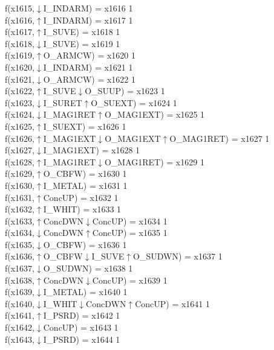 f(x1615,$\downarrow$I\_INDARM) = x1616 {1} \\
f(x1616,$\uparrow$I\_INDARM) = x1617 {1} \\
f(x1617,$\uparrow$I\_SUVE) = x1618 {1} \\
f(x1618,$\downarrow$I\_SUVE) = x1619 {1} \\
f(x1619,$\uparrow$O\_ARMCW) = x1620 {1} \\
f(x1620,$\downarrow$I\_INDARM) = x1621 {1} \\
f(x1621,$\downarrow$O\_ARMCW) = x1622 {1} \\
f(x1622,$\uparrow$I\_SUVE$\downarrow$O\_SUUP) = x1623 {1} \\
f(x1623,$\downarrow$I\_SURET$\uparrow$O\_SUEXT) = x1624 {1} \\
f(x1624,$\downarrow$I\_MAG1RET$\uparrow$O\_MAG1EXT) = x1625 {1} \\
f(x1625,$\uparrow$I\_SUEXT) = x1626 {1} \\
f(x1626,$\uparrow$I\_MAG1EXT$\downarrow$O\_MAG1EXT$\uparrow$O\_MAG1RET) = x1627 {1} \\
f(x1627,$\downarrow$I\_MAG1EXT) = x1628 {1} \\
f(x1628,$\uparrow$I\_MAG1RET$\downarrow$O\_MAG1RET) = x1629 {1} \\
f(x1629,$\uparrow$O\_CBFW) = x1630 {1} \\
f(x1630,$\uparrow$I\_METAL) = x1631 {1} \\
f(x1631,$\uparrow$ConcUP) = x1632 {1} \\
f(x1632,$\uparrow$I\_WHIT) = x1633 {1} \\
f(x1633,$\uparrow$ConcDWN$\downarrow$ConcUP) = x1634 {1} \\
f(x1634,$\downarrow$ConcDWN$\uparrow$ConcUP) = x1635 {1} \\
f(x1635,$\downarrow$O\_CBFW) = x1636 {1} \\
f(x1636,$\uparrow$O\_CBFW$\downarrow$I\_SUVE$\uparrow$O\_SUDWN) = x1637 {1} \\
f(x1637,$\downarrow$O\_SUDWN) = x1638 {1} \\
f(x1638,$\uparrow$ConcDWN$\downarrow$ConcUP) = x1639 {1} \\
f(x1639,$\downarrow$I\_METAL) = x1640 {1} \\
f(x1640,$\downarrow$I\_WHIT$\downarrow$ConcDWN$\uparrow$ConcUP) = x1641 {1} \\
f(x1641,$\uparrow$I\_PSRD) = x1642 {1} \\
f(x1642,$\downarrow$ConcUP) = x1643 {1} \\
f(x1643,$\downarrow$I\_PSRD) = x1644 {1} \\
